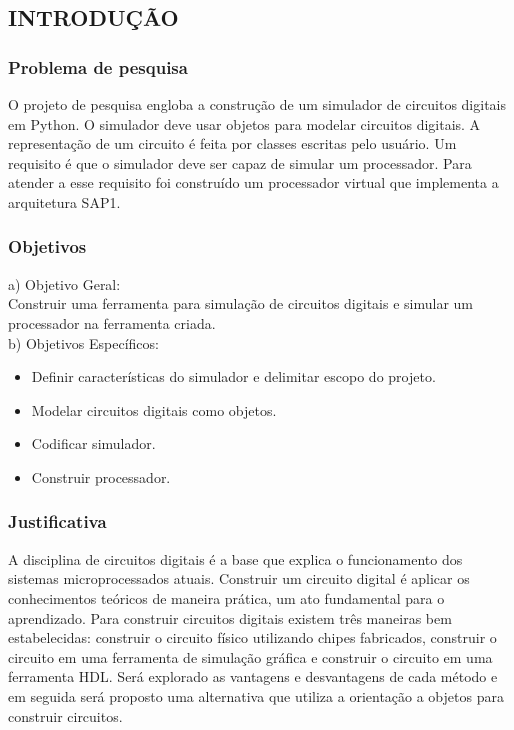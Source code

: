 \subsection{INTRODUÇÃO}
\subsubsection{Problema de pesquisa}
O projeto de pesquisa engloba a construção de um simulador de circuitos digitais em Python.
O simulador deve usar objetos para modelar circuitos digitais.
A representação de um circuito é feita por classes escritas pelo usuário.
Um requisito é que o simulador deve ser capaz de simular um processador.
Para atender a esse requisito foi construído um processador virtual que implementa a arquitetura SAP1.

\subsubsection{Objetivos}
a) Objetivo Geral:\\
Construir uma ferramenta para simulação de circuitos digitais e simular um processador na ferramenta criada.\\
b) Objetivos Específicos:
\begin{itemize}
\item Definir características do simulador e delimitar escopo do projeto.
\item Modelar circuitos digitais como objetos.
\item Codificar simulador.
\item Construir processador.
\end{itemize}

\subsubsection{Justificativa}

A disciplina de circuitos digitais é a base que explica o funcionamento dos sistemas microprocessados atuais.
Construir um circuito digital é aplicar os conhecimentos teóricos de maneira prática, um ato fundamental para o aprendizado.
Para construir circuitos digitais existem três maneiras bem estabelecidas: construir o circuito físico utilizando chipes fabricados, construir o circuito em uma ferramenta de simulação gráfica e construir o circuito em uma ferramenta HDL.
Será explorado as vantagens e desvantagens de cada método e em seguida será proposto uma alternativa que utiliza a orientação a objetos para construir circuitos.

